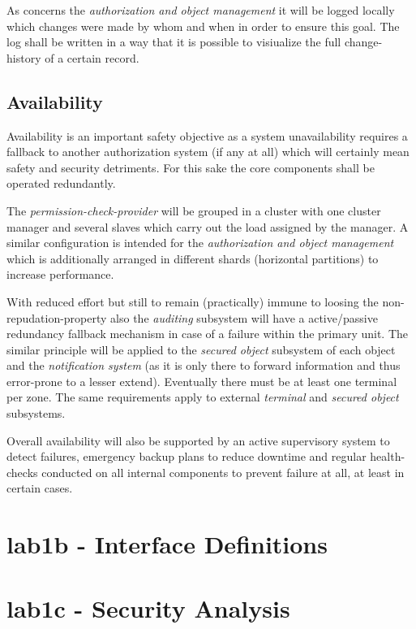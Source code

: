 \documentclass[12pt,a4paper,titlepage,oneside]{scrartcl}
\begin{document}
As concerns the \emph{authorization and object management} it will be logged locally which changes were made by whom and when in
order to ensure this goal. The log shall be written in a way that it is possible to visiualize the full change-history of a
certain record.


\subsection{Availability}
Availability is an important safety objective as a system unavailability requires a fallback to another authorization system (if any at all)
which will certainly mean safety and security detriments. For this sake the core components shall be operated redundantly.

The \emph{permission-check-provider} will be grouped in a cluster with one cluster manager and several slaves which carry
out the load assigned by the manager. A similar configuration is intended for the \emph{authorization and object management} 
which is additionally arranged in different shards (horizontal partitions) to increase performance.

With reduced effort but still to remain (practically) immune to loosing the non-repudation-property also the \emph{auditing} subsystem
will have a active/passive redundancy fallback mechanism in case of a failure within the primary unit. The similar principle
will be applied to the \emph{secured object} subsystem of each object and the \emph{notification system} (as it is only there
to forward information and thus error-prone to a lesser extend). Eventually there must be at least one terminal per zone. The same
requirements apply to external \emph{terminal} and \emph{secured object} subsystems.

Overall availability will also be supported by an active supervisory system to detect failures, emergency backup plans to reduce downtime
and regular health-checks conducted on all internal components to prevent failure at all, at least in certain cases.


\section{lab1b - Interface Definitions}

\section{lab1c - Security Analysis}


%
%
\end{document}
